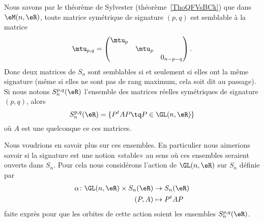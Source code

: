 Nous savons par le théorème de Sylvester (théorème~\ref{ThoQFVsBCk}) que dans \( \eM(n,\eR)\), toute matrice symétrique de signature \( (p,q)\) est semblable à la matrice
\begin{equation}
    \mtu_{p,q}=\begin{pmatrix}
        \mtu_p    &       &       \\
        &   \mtu_{p}    &       \\
        &       &   0_{n-p-q}
    \end{pmatrix}.
\end{equation}
Donc deux matrices de \( S_n\) sont semblables si et seulement si elles ont la même signature (même si elles ne sont pas de rang maximum, cela soit dit au passage). Si nous notons \( S_n^{p,q}(\eR)\) l'ensemble des matrices réelles symétriques de signature \( (p,q)\), alors
\begin{equation}
    S_n^{p,q}(\eR)=\{ P^tAP\tq P\in \GL(n,\eR) \}
\end{equation}
où \( A\) est une quelconque ce ces matrices.

Nous voudrions en savoir plus sur ces ensembles. En particulier nous aimerions savoir si la signature est une notion «stable» au sens où ces ensembles seraient ouverts dans \( S_n\). Pour cela nous considérons l'action de \( \GL(n,\eR)\) sur \( S_n\) définie par
\begin{equation}
    \begin{aligned}
        \alpha\colon \GL(n,\eR)\times S_n(\eR)&\to S_n(\eR) \\
        (P,A)&\mapsto P^tAP
    \end{aligned}
\end{equation}
faite exprès pour que les orbites de cette action soient les ensembles \( S_n^{p,q}(\eR)\).


